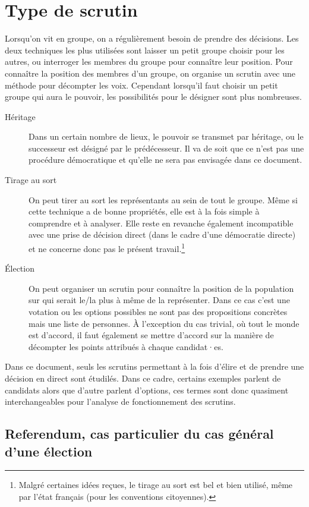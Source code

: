 \documentclass[../report]{subfiles}
\begin{document}
  \section{Type de scrutin}
  Lorsqu'on vit en groupe, on a régulièrement besoin de prendre des décisions.
  Les deux techniques les plus utilisées sont laisser un petit groupe choisir pour les autres, ou 
  interroger les membres du groupe pour connaître leur position.
  Pour connaître la position des membres d'un groupe, on organise un scrutin avec une méthode pour décompter
  les voix.
  Cependant lorsqu'il faut choisir un petit groupe qui aura le pouvoir, les possibilités pour le désigner sont
  plus nombreuses.
  \begin{description}
  	\item[Héritage] Dans un certain nombre de lieux, le pouvoir se transmet par héritage, ou le successeur est désigné par le prédécesseur.
  	Il va de soit que ce n'est pas une procédure démocratique et qu'elle ne sera pas envisagée dans ce document.
  	\item[Tirage au sort] On peut tirer au sort les représentants au sein de tout le groupe. 
  	Même si cette technique a de bonne propriétés, elle est à la fois simple à comprendre et à analyser. Elle reste en revanche également
  	incompatible avec une prise de décision direct (dans le cadre d'une démocratie directe) et ne concerne donc pas le présent travail.\footnote{Malgré certaines idées reçues, le tirage au sort est bel et bien utilisé, même par l'état français (pour les conventions citoyennes).}
  	\item[Élection] On peut organiser un scrutin pour connaître la position de la population sur qui serait le/la plus 
  	à même de la représenter. 
  	Dans ce cas c'est une votation ou les options possibles ne sont pas des propositions concrètes mais une liste de personnes.
  	À l'exception du cas trivial, où tout le monde est d'accord, il faut également se mettre d'accord sur la manière
  	de décompter les points attribués à chaque candidat·es.
  \end{description}
  
  Dans ce document, seuls les scrutins permettant à la fois d'élire et de prendre une décision en direct sont étudilés.
  Dans ce cadre, certains exemples parlent de candidats alors que d'autre parlent d'options, ces termes sont donc quasiment 
  interchangeables pour l'analyse de fonctionnement des scrutins.
  
  \subsection[Referendum, cas particulier]{Referendum, cas particulier du cas général d'une élection}
  
\end{document}
